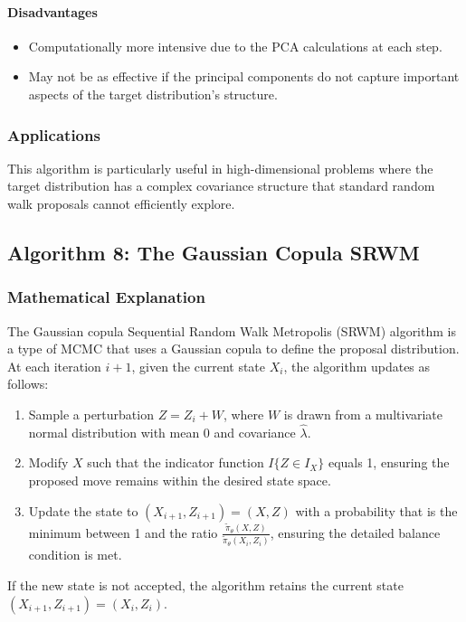 \documentclass{article}
\begin{document}
\paragraph{Disadvantages}
\begin{itemize}
    \item Computationally more intensive due to the PCA calculations at each step.
    \item May not be as effective if the principal components do not capture important aspects of the target distribution's structure.
\end{itemize}

\subsubsection{Applications}
This algorithm is particularly useful in high-dimensional problems where the target distribution has a complex covariance structure that standard random walk proposals cannot efficiently explore.

\subsection{Algorithm 8: The Gaussian Copula SRWM}

\subsubsection{Mathematical Explanation}
The Gaussian copula Sequential Random Walk Metropolis (SRWM) algorithm is a type of MCMC that uses a Gaussian copula to define the proposal distribution. At each iteration \(i + 1\), given the current state \(X_i\), the algorithm updates as follows:
\begin{enumerate}
    \item Sample a perturbation \(Z = Z_i + W\), where \(W\) is drawn from a multivariate normal distribution with mean 0 and covariance \( \hat{\lambda} \).
    \item Modify \(X\) such that the indicator function \(I\{Z \in I_{X}\}\) equals 1, ensuring the proposed move remains within the desired state space.
    \item Update the state to \((X_{i+1}, Z_{i+1}) = (X, Z)\) with a probability that is the minimum between 1 and the ratio \(\frac{\tilde{\pi}_{\theta} (X, Z)}{\tilde{\pi}_{\theta} (X_i, Z_i)}\), ensuring the detailed balance condition is met.
\end{enumerate}
If the new state is not accepted, the algorithm retains the current state \( (X_{i+1}, Z_{i+1}) = (X_i, Z_i) \).
\end{document}
